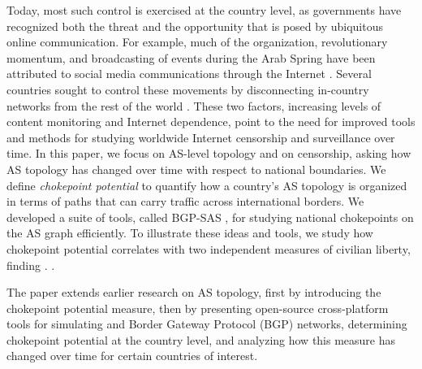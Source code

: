 \documentclass[10pt, conference, letterpaper]{IEEEtran}
\newcommand{\toolname}{BGP-SAS }
\begin{document}
Today, most such control is exercised at the country level,
as governments have recognized both the threat and the opportunity
that is posed by ubiquitous online communication. For example, much
of the organization, revolutionary momentum, and broadcasting of
events during the Arab Spring have been attributed to social media
communications through the Internet \cite{arabspring}. Several countries
sought to control these movements by disconnecting in-country networks from the rest of the world \cite{BGPdisrupt}.
These two factors, increasing levels of content monitoring and
Internet dependence, point to the need for improved tools and methods
for studying worldwide Internet censorship and surveillance over time.
  In this paper, we focus on AS-level topology and on
censorship, asking how AS topology has changed over time with respect
to national boundaries.  We define \emph{chokepoint potential} to
quantify how a country’s AS topology is organized in terms of paths
that can carry traffic across international borders.  We developed a
suite of tools, called \toolname, for studying national chokepoints on
the AS graph efficiently. To illustrate these ideas and tools, we
study how chokepoint potential correlates with two independent
measures of civilian liberty, finding . .

The paper extends earlier research on AS topology, first by introducing the chokepoint potential measure, then by presenting open-source cross-platform tools for simulating
and Border Gateway Protocol (BGP) networks, determining chokepoint potential at the country level, and analyzing how this measure has changed over time for certain countries of interest.



\end{document}
